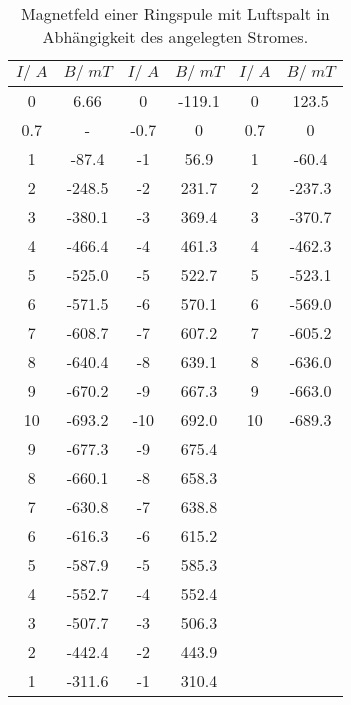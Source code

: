\begin{table}[H]
  \centering
   \begin{tabular}{c c| c c| c c}
    \toprule
    $I /\;\si{A}$ & $ B/\;\si{mT}$ & $I /\;\si{A}$ & $ B/\;\si{mT}$ &
    $I /\;\si{A}$ & $ B/\;\si{mT}$\\
    \midrule
    0 & 6.66 & 0 & -119.1 & 0 & 123.5 \\
    0.7 & - & -0.7 & 0 &  0.7 & 0 \\
    1 & -87.4 & -1 & 56.9 & 1 & -60.4 \\
    2 & -248.5 & -2 & 231.7 & 2 & -237.3 \\
    3 & -380.1 & -3 & 369.4 & 3 & -370.7 \\
    4 & -466.4 & -4 & 461.3 & 4 & -462.3 \\
    5 & -525.0 & -5 & 522.7 & 5 & -523.1 \\
    6 & -571.5 & -6 & 570.1 & 6 & -569.0 \\
    7 & -608.7 & -7 & 607.2 & 7 & -605.2 \\
    8 & -640.4 & -8 & 639.1 & 8 & -636.0 \\
    9 & -670.2 & -9 & 667.3 & 9 & -663.0 \\
    10 & -693.2 & -10 & 692.0 & 10 & -689.3 \\
    9 & -677.3 &  -9 & 675.4 &  & \\
    8 & -660.1 & -8 & 658.3 &  &  \\
    7 & -630.8 &  -7 & 638.8 & &  \\
    6 & -616.3 & -6 & 615.2 &  &  \\
    5 & -587.9 & -5 & 585.3 &  &  \\
    4 & -552.7 & -4 & 552.4 &  &  \\
    3 & -507.7 & -3 & 506.3 &  &  \\
    2 & -442.4 & -2 & 443.9 &  &  \\
    1 & -311.6 & -1 & 310.4 &  &  \\
    \bottomrule
  \end{tabular}
  \caption{Magnetfeld einer Ringspule mit Luftspalt
  in Abhängigkeit des angelegten Stromes.}
  \label{tab:tabelle1}
\end{table}
